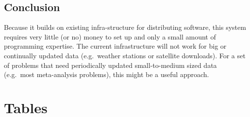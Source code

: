 \documentclass[a4paper,11pt]{article}
\begin{document}
%
%
%
%
%
%
%
%


\subsection{Conclusion}

Because it builds on existing infra-structure for distributing software,
this system requires very little (or no) money to set up and only a
small amount of programming expertise. The current infrastructure will
not work for big or continually updated data (e.g.~weather stations or
satellite downloads). For a set of problems that need periodically
updated small-to-medium sized data (e.g.~most meta-analysis problems),
this might be a useful approach.

\newpage

\section{Tables}
\end{document}
